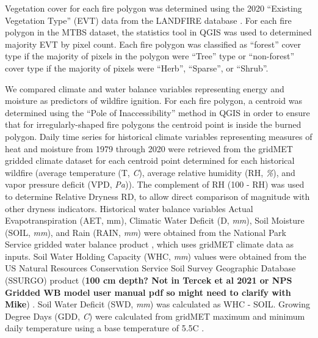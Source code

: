 \documentclass[11pt]{article}
\begin{document}
Vegetation cover for each fire polygon was determined using the 2020 ``Existing Vegetation Type'' (EVT) data from the LANDFIRE database \citep{rollinsLANDFIRENationallyConsistent2009}.  For each fire polygon in the MTBS dataset, the statistics tool in QGIS was used to determined majority EVT by pixel count.  Each fire polygon was classified as ``forest'' cover type if the majority of pixels in the polygon were ``Tree'' type or ``non-forest'' cover type if the majority of pixels were ``Herb'', ``Sparse'', or ``Shrub''.


We compared climate and water balance variables representing energy and moisture as predictors of wildfire ignition. For each fire polygon, a centroid was determined using the ``Pole of Inaccessibility'' method in QGIS \citep{QGIS_software} in order to ensure that for irregularly-shaped fire polygons the centroid point is inside the burned polygon. Daily time series for historical climate variables representing measures of heat and moisture from 1979 through 2020 were retrieved from the gridMET gridded climate dataset \citep{abatzoglouDevelopmentGriddedSurface2013} for each centroid point determined for each historical wildfire (average temperature (T, \textit{\degree C}), average relative humidity (RH, \textit{\%}), and vapor pressure deficit (VPD, \textit{Pa})).  The complement of RH (100 - RH) was used to determine Relative Dryness RD, to allow direct comparison of magnitude with other dryness indicators. Historical water balance variables Actual Evapotranspiration (AET, mm), Climatic Water Deficit (D, \textit{mm}), Soil Moisture (SOIL, \textit{mm}), and Rain (RAIN, \textit{mm}) were obtained from the National Park Service gridded water balance product \citep{tercekHistoricalChangesPlant2021}, which uses gridMET climate data as inputs. Soil Water Holding Capacity (WHC, \textit{mm}) values were obtained from the US Natural Resources Conservation Service 
Soil Survey Geographic Database (SSURGO) product (\textbf{100 cm depth?  Not in Tercek et al 2021 or NPS Gridded WB model user manual pdf so might need to clarify with Mike}) \citep{naturalresourcesconservationserviceSoilSurveyGeographic2015}. Soil Water Deficit (SWD, \textit{mm}) was calculated as WHC - SOIL.  Growing Degree Days (GDD, \textit{\degree C}) were calculated from gridMET maximum and minimum daily temperature using a base temperature of 5.5\degree C \citep{mcmasterGrowingDegreedaysOne1997}.  
\end{document}
